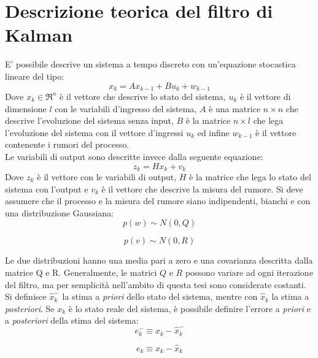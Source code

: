 \section{Descrizione teorica del filtro di Kalman}
\label{filtroKalmanLineare}
E' possibile descrive un sistema a tempo discreto con un'equazione stocastica lineare del tipo:
\begin{equation}
x_k = Ax_{k-1} + B u_k + w_{k-1}
\end{equation}
Dove $x_k \in \Re^n$ è il vettore che descrive lo stato del sistema, $u_k$ è il vettore di dimensione $l$ con le variabili d'ingresso del sistema, $A$ è una matrice $n \times n$ che descrive l'evoluzione del sistema senza input, $B$ è la matrice $n \times l$ che lega l'evoluzione del sistema con il vettore d'ingressi $u_k$ ed infine $w_{k-1}$ è il vettore contenente i rumori del processo.\\
Le variabili di output sono descritte invece dalla seguente equazione:
\begin{equation}
z_k = Hx_k + v_k
\end{equation}
Dove $z_k$ è il vettore con le variabili di output, $H$ è la matrice che lega lo stato del sistema con l'output e $v_k$ è il vettore che descrive la misura del rumore.
Si deve assumere che il processo e la misura del rumore siano indipendenti, bianchi e con una distribuzione Gaussiana:
\begin{equation}
p(w) \sim N(0,Q)
\end{equation}

\begin{equation}
p(v) \sim N(0,R)
\end{equation}

Le due distribuzioni hanno una media pari a zero e una covarianza descritta dalla matrice Q e R. Generalmente, le matrici $Q$ e $R$ possono variare ad ogni iterazione del filtro, ma per semplicità nell'ambito di questa tesi sono considerate costanti.\\
Si definisce $\hat{x}_k^-$ la stima a \textit{priori} dello stato del sistema, mentre con $\hat{x}_k$ la stima a \textit{posteriori}. Se $x_k$ è lo stato reale del sistema, è possibile definire l'errore a \textit{priori} e a \textit{posteriori} della stima del sistema:
\begin{equation}
e_k^- \equiv x_k - \hat{x}_k^-
\end{equation}

\begin{equation}
e_k \equiv x_k - \hat{x}_k
\end{equation}

